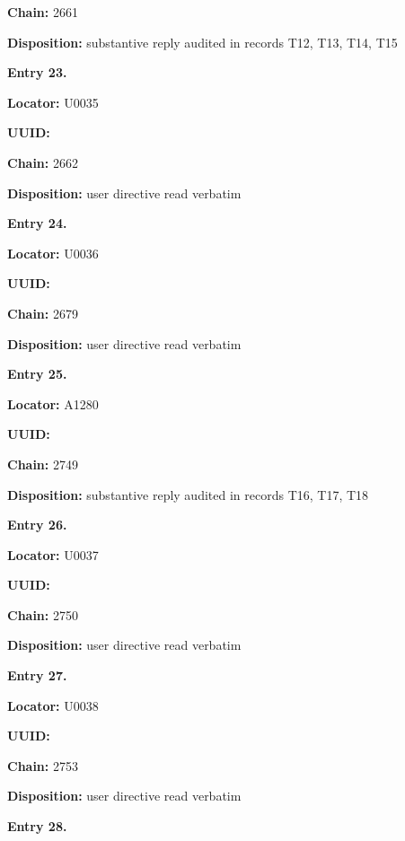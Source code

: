 \textbf{Chain:} 2661

\textbf{Disposition:} substantive reply audited in records T12, T13,
T14, T15


\textbf{Entry 23.}

\textbf{Locator:} U0035

\textbf{UUID:} \protect{}

\textbf{Chain:} 2662

\textbf{Disposition:} user directive read verbatim


\textbf{Entry 24.}

\textbf{Locator:} U0036

\textbf{UUID:} \protect{}

\textbf{Chain:} 2679

\textbf{Disposition:} user directive read verbatim


\textbf{Entry 25.}

\textbf{Locator:} A1280

\textbf{UUID:} \protect{}

\textbf{Chain:} 2749

\textbf{Disposition:} substantive reply audited in records T16, T17, T18


\textbf{Entry 26.}

\textbf{Locator:} U0037

\textbf{UUID:} \protect{}

\textbf{Chain:} 2750

\textbf{Disposition:} user directive read verbatim


\textbf{Entry 27.}

\textbf{Locator:} U0038

\textbf{UUID:} \protect{}

\textbf{Chain:} 2753

\textbf{Disposition:} user directive read verbatim


\textbf{Entry 28.}

